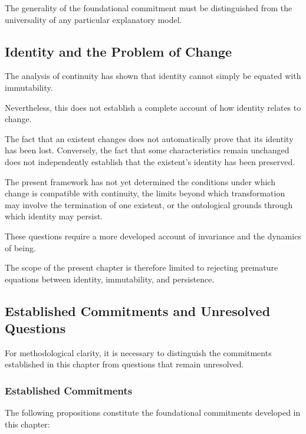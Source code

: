 The generality of the foundational commitment must be distinguished from the universality of any particular explanatory model.

\subsection{Identity and the Problem of Change}

The analysis of continuity has shown that identity cannot simply be equated with immutability.

Nevertheless, this does not establish a complete account of how identity relates to change.

The fact that an existent changes does not automatically prove that its identity has been lost. Conversely, the fact that some characteristics remain unchanged does not independently establish that the existent's identity has been preserved.

The present framework has not yet determined the conditions under which change is compatible with continuity, the limits beyond which transformation may involve the termination of one existent, or the ontological grounds through which identity may persist.

These questions require a more developed account of invariance and the dynamics of being.

The scope of the present chapter is therefore limited to rejecting premature equations between identity, immutability, and persistence.

\subsection{Established Commitments and Unresolved Questions}

For methodological clarity, it is necessary to distinguish the commitments established in this chapter from questions that remain unresolved.

\subsubsection{Established Commitments}

The following propositions constitute the foundational commitments developed in this chapter:

